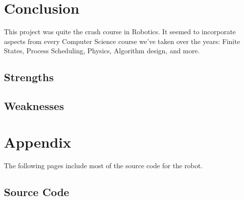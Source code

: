 \documentclass[12pt]{article}
\begin{document}
\clearpage
\section{Conclusion}
This project was quite the crash course in Robotics.  It seemed to incorporate aspects from every Computer Science course we've taken over the years: Finite States, Process Scheduling, Physics, Algorithm design, and more.


\subsection{Strengths}
\subsection{Weaknesses}

\clearpage
\section{Appendix}
The following pages include most of the source code for the robot.
\subsection{Source Code}
\end{document}
